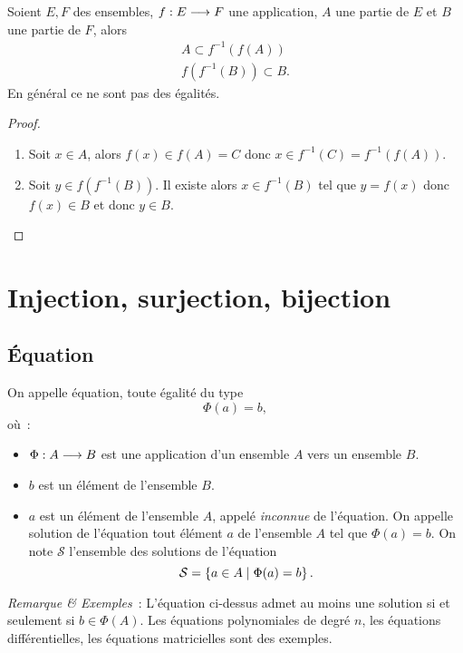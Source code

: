 \begin{prop}
  Soient \(E, F\) des ensembles, \(f:E \longrightarrow{} F\) une application, \(A\) 
  une partie de \(E\) et \(B\) une partie de \(F\), alors
  \begin{gather}
    A \subset f^{-1}(f(A)) \\
    f(f^{-1}(B)) \subset B.
  \end{gather}
  En général ce ne sont pas des égalités.
\end{prop}

\begin{proof}
  \begin{enumerate}
    \item Soit \(x \in A\), alors \(f(x) \in f(A) = C\) donc \(x \in 
      f^{-1}(C) = f^{-1}(f(A))\).
    \item Soit \(y \in f(f^{-1}(B))\). Il existe alors \(x \in f^{-1}(B)\) 
      tel que \(y = f(x)\) donc \(f(x) \in B\) et donc \(y \in B\).
  \end{enumerate}
\end{proof}

\section{Injection, surjection, bijection}
\label{chap3-sec:injsurbij}

\subsection{Équation}
\label{chap3-subsec:equation}

\begin{defdef}
  On appelle équation, toute égalité du type
  \begin{equation}
    \Phi(a) = b,
  \end{equation}
  où~:
  \begin{itemize}
    \item \(\Phi:A \longrightarrow{} B\) est une application d'un ensemble \(A\) 
      vers un ensemble \(B\).
    \item \(b\) est un élément de l'ensemble \(B\).
    \item \(a\) est un élément de l'ensemble \(A\), appelé \emph{inconnue} de 
      l'équation. On appelle solution de l'équation tout élément \(a\) de 
      l'ensemble \(A\) tel que \(\Phi(a) = b\). On note \(\mathcal{S}\) 
      l'ensemble des solutions de l'équation
      \begin{equation}
        \mathcal{S} = \left\{a \in A\mathrel{}\middle|\mathrel{}\Phi(a) = b\right\}.
      \end{equation}
  \end{itemize}
\end{defdef}
\emph{Remarque \& Exemples}~: L'équation ci-dessus admet au moins une solution 
si et seulement si \(b \in \Phi(A)\). Les équations polynomiales de degré \(n\), 
les équations différentielles, les équations matricielles sont des exemples.

